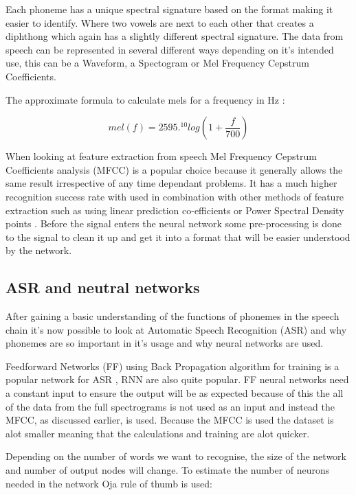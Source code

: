 \documentclass[11pt]{article}
\begin{document}
    Each phoneme has a unique spectral signature based on the format making it easier to identify. Where two vowels are next to each other that creates a diphthong which again has a slightly different spectral signature. The data from speech can be represented in several different ways depending on it's intended use, this can be a Waveform, a Spectogram or Mel Frequency Cepstrum Coefficients. 
    
    The approximate formula to calculate mels for a frequency in Hz \cite{Gevaert2010NeuralRecognition}:
    
    \begin{equation}
    mel(f)=2595.^{10} log(1+ \frac{f}{700})
    \end{equation}

   When looking at feature extraction from speech Mel Frequency Cepstrum Coefficients analysis (MFCC) is a popular choice because it generally allows the same result irrespective of any time dependant problems. It has a much higher recognition success rate with used in combination with other methods of feature extraction such as using linear prediction co-efficients or Power Spectral Density points \cite{Moonasar2001ASystems}. Before the signal enters the neural network some pre-processing \cite{Liu1993EfficientRecognition} is done to the signal to clean it up and get it into a format that will be easier understood by the network.

    \subsection{ASR and neutral networks}
    After gaining a basic understanding of the functions of phonemes in the speech chain it's now possible to look at Automatic Speech Recognition (ASR) and why phonemes are so important in it's usage and why neural networks are used.
    
    Feedforward Networks (FF) using Back Propagation algorithm for training is a popular network for ASR \cite{K.R2016AutomaticSurvey}, RNN are also quite popular. FF neural networks need a constant input to ensure the output will be as expected because of this the all of the data from the full spectrograms is not used as an input and instead the MFCC, as discussed earlier, is used. Because the MFCC is used the dataset is alot smaller meaning that the calculations and training are alot quicker. 
    
    Depending on the number of words we want to recognise, the size of the network and number of output nodes will change. To estimate the number of neurons needed in the network Oja rule of thumb \cite{Oja1982SimplifiedAnalyzer} is used:
    
\end{document}
